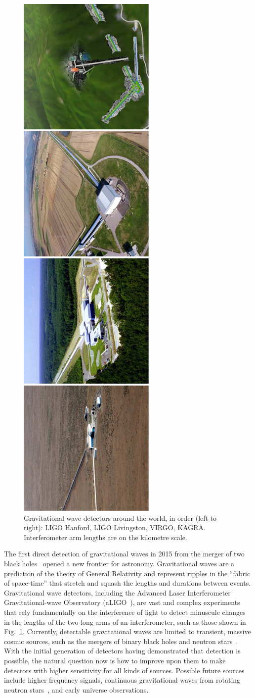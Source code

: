 \documentclass[aps,pra,superscriptaddress,reprint,nofootinbib]{revtex4-1}
\begin{document}
\begin{figure}
	\begin{center}
	\includegraphics[height=\textwidth,angle=-90]{figures/gwo_ifos-pictures.pdf}
	\end{center}
	\caption{Gravitational wave detectors around the world, in order (left to right): LIGO Hanford, LIGO Livingston, VIRGO, KAGRA. Interferometer arm lengths are on the kilometre scale.}
	\label{fig:gw_ifos}
\end{figure}

The first direct detection of gravitational waves in 2015 from the merger of two black holes~\cite{GW150914} opened a new frontier for astronomy. 
Gravitational waves are a prediction of the theory of General Relativity and represent ripples in the ``fabric of space-time'' that stretch and squash the lengths and durations between events. Gravitational wave detectors, including the Advanced Laser Interferometer Gravitational-wave Observatory (aLIGO~\cite{AdvancedLIGO:2015}), are vast and complex experiments that rely fundamentally on the interference of light to detect minuscule changes in the lengths of the two long arms of an interferometer, such as those shown in Fig.~\ref{fig:gw_ifos}. Currently, detectable gravitational waves are limited to transient, massive cosmic sources, such as the mergers of binary black holes and neutron stars~\cite{GWTC-1:2018}. With the initial generation of detectors having demonstrated that detection is possible, the natural question now is how to improve upon them to make detectors with higher sensitivity for all kinds of sources. Possible future sources include higher frequency signals, continuous gravitational waves from rotating neutron stars~\cite{SuvorovaEtAl:2016}, and early universe observations.
\end{document}
